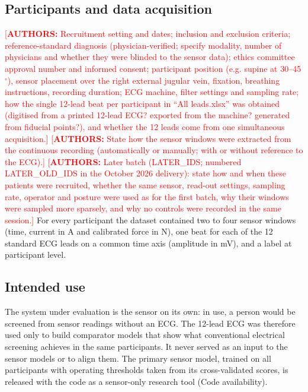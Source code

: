 \documentclass[11pt]{article}
\newcommand{\authnote}[1]{\textcolor{red}{[\textbf{AUTHORS:} #1]}}
\begin{document}
\subsection*{Participants and data acquisition}
\authnote{Recruitment setting and dates; inclusion and exclusion criteria; reference-standard diagnosis (physician-verified; specify modality, number of physicians and whether they were blinded to the sensor data); ethics committee approval number and informed consent; participant position (e.g. supine at 30--45$^\circ$), sensor placement over the right external jugular vein, fixation, breathing instructions, recording duration; ECG machine, filter settings and sampling rate; how the single 12-lead beat per participant in ``All leads.xlsx'' was obtained (digitised from a printed 12-lead ECG? exported from the machine? generated from fiducial points?), and whether the 12 leads come from one simultaneous acquisition.} \authnote{State how the sensor windows were extracted from the continuous recording (automatically or manually; with or without reference to the ECG).} \authnote{Later batch ({{LATER_IDS}}; numbered {{LATER_OLD_IDS}} in the October 2026 delivery): state how and when these patients were recruited, whether the same sensor, read-out settings, sampling rate, operator and posture were used as for the first batch, why their windows were sampled more sparsely, and why no controls were recorded in the same session.} For every participant the dataset contained two to four sensor windows (time, current in A and calibrated force in N), one beat for each of the 12 standard ECG leads on a common time axis (amplitude in mV), and a label at participant level.

\subsection*{Intended use}
The system under evaluation is the sensor on its own: in use, a person would be screened from sensor readings without an ECG. The 12-lead ECG was therefore used only to build comparator models that show what conventional electrical screening achieves in the same participants. It never served as an input to the sensor models or to align them. The primary sensor model, trained on all participants with operating thresholds taken from its cross-validated scores, is released with the code as a sensor-only research tool (Code availability).
\end{document}

